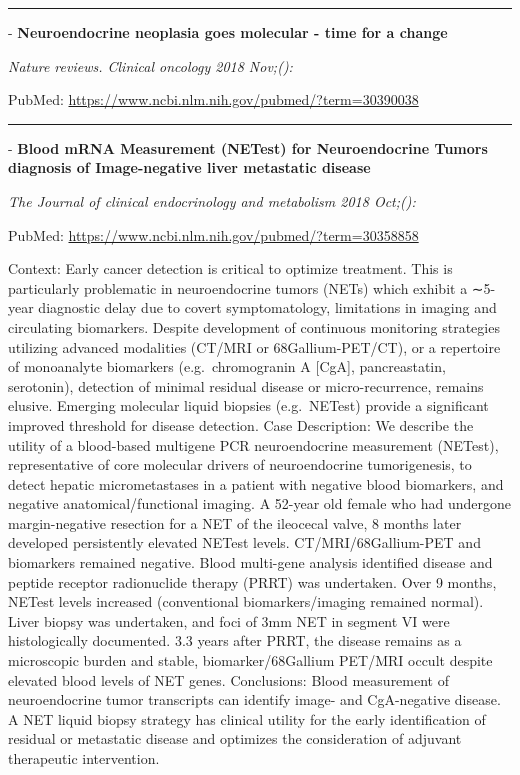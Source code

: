 \documentclass[]{article}
\begin{document}
{}

\begin{center}\rule{0.5\linewidth}{\linethickness}\end{center}

 - \textbf{Neuroendocrine neoplasia goes molecular - time for a change}

\emph{Nature reviews. Clinical oncology 2018 Nov;():}

PubMed: \url{https://www.ncbi.nlm.nih.gov/pubmed/?term=30390038}

{}

{}

\begin{center}\rule{0.5\linewidth}{\linethickness}\end{center}

 - \textbf{Blood mRNA Measurement (NETest) for Neuroendocrine Tumors
diagnosis of Image-negative liver metastatic disease}

\emph{The Journal of clinical endocrinology and metabolism 2018 Oct;():}

PubMed: \url{https://www.ncbi.nlm.nih.gov/pubmed/?term=30358858}

Context: Early cancer detection is critical to optimize treatment. This
is particularly problematic in neuroendocrine tumors (NETs) which
exhibit a ∼5-year diagnostic delay due to covert symptomatology,
limitations in imaging and circulating biomarkers. Despite development
of continuous monitoring strategies utilizing advanced modalities
(CT/MRI or 68Gallium-PET/CT), or a repertoire of monoanalyte biomarkers
(e.g.~chromogranin A {[}CgA{]}, pancreastatin, serotonin), detection of
minimal residual disease or micro-recurrence, remains elusive. Emerging
molecular liquid biopsies (e.g.~NETest) provide a significant improved
threshold for disease detection. Case Description: We describe the
utility of a blood-based multigene PCR neuroendocrine measurement
(NETest), representative of core molecular drivers of neuroendocrine
tumorigenesis, to detect hepatic micrometastases in a patient with
negative blood biomarkers, and negative anatomical/functional imaging. A
52-year old female who had undergone margin-negative resection for a NET
of the ileocecal valve, 8 months later developed persistently elevated
NETest levels. CT/MRI/68Gallium-PET and biomarkers remained negative.
Blood multi-gene analysis identified disease and peptide receptor
radionuclide therapy (PRRT) was undertaken. Over 9 months, NETest levels
increased (conventional biomarkers/imaging remained normal). Liver
biopsy was undertaken, and foci of 3mm NET in segment VI were
histologically documented. 3.3 years after PRRT, the disease remains as
a microscopic burden and stable, biomarker/68Gallium PET/MRI occult
despite elevated blood levels of NET genes. Conclusions: Blood
measurement of neuroendocrine tumor transcripts can identify image- and
CgA-negative disease. A NET liquid biopsy strategy has clinical utility
for the early identification of residual or metastatic disease and
optimizes the consideration of adjuvant therapeutic intervention.
\end{document}
